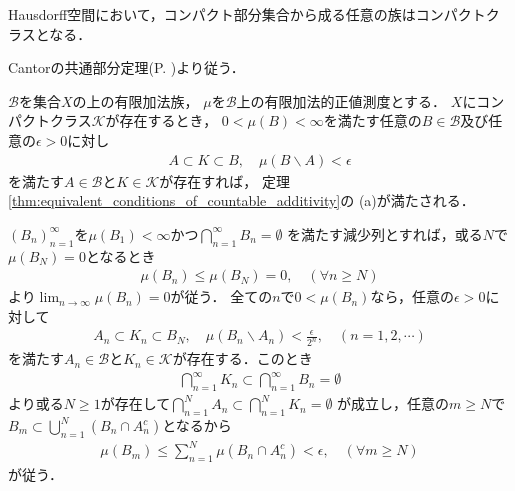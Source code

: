 		\begin{screen}
			\begin{thm}\label{thm:compact_class_Haudorff}
				Hausdorff空間において，コンパクト部分集合から成る任意の族はコンパクトクラスとなる．
			\end{thm}
		\end{screen}
		
		\begin{prf}
			Cantorの共通部分定理(P. \pageref{thm:Cantor_intersection_theorem})より従う．
			\QED
		\end{prf}
		
		\begin{screen}
			\begin{thm}[コンパクトクラスと共通点性]\label{thm:compact_class_intersection}
				$\mathcal{B}$を集合$X$の上の有限加法族，
				$\mu$を$\mathcal{B}$上の有限加法的正値測度とする．
				$X$にコンパクトクラス$\mathcal{K}$が存在するとき，
				$0 < \mu(B) < \infty$を満たす任意の$B \in \mathcal{B}$及び任意の$\epsilon > 0$に対し
				\begin{align}
					A \subset K \subset B,
					\quad \mu(B \backslash A) < \epsilon
				\end{align}
				を満たす$A \in \mathcal{B}$と$K \in \mathcal{K}$が存在すれば，
				定理\ref{thm:equivalent_conditions_of_countable_additivity}の
				(a)が満たされる．
			\end{thm}
		\end{screen}
		
		\begin{prf}
			$(B_n)_{n=1}^\infty$を$\mu(B_1) < \infty$かつ$\bigcap_{n=1}^\infty B_n = \emptyset$
			を満たす減少列とすれば，或る$N$で$\mu(B_N) = 0$となるとき
			\begin{align}
				\mu(B_n) \leq \mu(B_N) = 0,
				\quad (\forall n \geq N)
			\end{align}
			より$\lim_{n \to \infty} \mu(B_n) = 0$が従う．
			全ての$n$で$0 < \mu(B_n)$なら，任意の$\epsilon > 0$に対して
			\begin{align}
				A_n \subset K_n \subset B_N,
				\quad \mu(B_n \backslash A_n) < \frac{\epsilon}{2^n},
				\quad (n=1,2,\cdots)
			\end{align}
			を満たす$A_n \in \mathcal{B}$と$K_n \in \mathcal{K}$が存在する．このとき
			\begin{align}
				\bigcap_{n=1}^\infty K_n \subset \bigcap_{n=1}^\infty B_n = \emptyset
			\end{align}
			より或る$N \geq 1$が存在して$\bigcap_{n=1}^N A_n \subset \bigcap_{n=1}^N K_n = \emptyset$
			が成立し，任意の$m \geq N$で$B_m \subset \bigcup_{n=1}^N (B_n \cap A_n^c)$となるから
			\begin{align}
				\mu(B_m) \leq \sum_{n=1}^N \mu(B_n \cap A_n^c) < \epsilon,
				\quad (\forall m \geq N)
			\end{align}
			が従う．
			\QED
		\end{prf}
		
